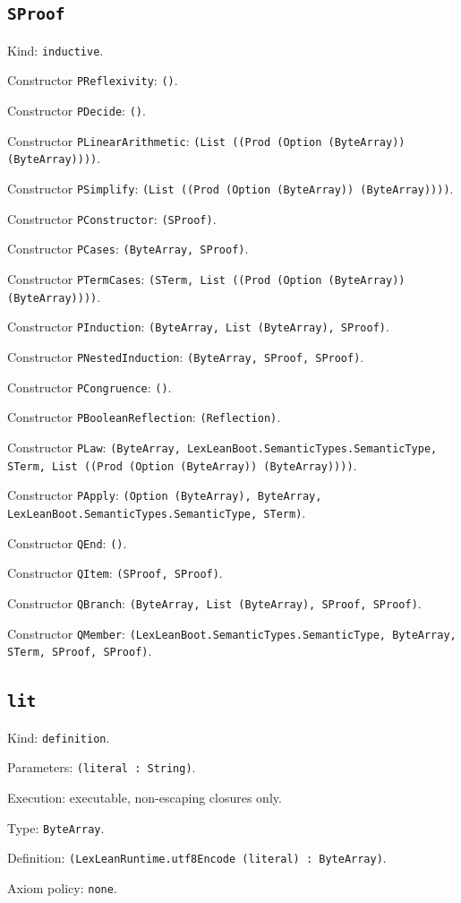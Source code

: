 \documentclass[11pt]{article}
\begin{document}
\subsection*{\texttt{SProof}}
\noindent Kind: \texttt{inductive}.\par
\noindent Constructor \texttt{PReflexivity}: \texttt{()}.\par
\noindent Constructor \texttt{PDecide}: \texttt{()}.\par
\noindent Constructor \texttt{PLinearArithmetic}: \texttt{(List ((Prod (Option (ByteArray)) (ByteArray))))}.\par
\noindent Constructor \texttt{PSimplify}: \texttt{(List ((Prod (Option (ByteArray)) (ByteArray))))}.\par
\noindent Constructor \texttt{PConstructor}: \texttt{(SProof)}.\par
\noindent Constructor \texttt{PCases}: \texttt{(ByteArray, SProof)}.\par
\noindent Constructor \texttt{PTermCases}: \texttt{(STerm, List ((Prod (Option (ByteArray)) (ByteArray))))}.\par
\noindent Constructor \texttt{PInduction}: \texttt{(ByteArray, List (ByteArray), SProof)}.\par
\noindent Constructor \texttt{PNestedInduction}: \texttt{(ByteArray, SProof, SProof)}.\par
\noindent Constructor \texttt{PCongruence}: \texttt{()}.\par
\noindent Constructor \texttt{PBooleanReflection}: \texttt{(Reflection)}.\par
\noindent Constructor \texttt{PLaw}: \texttt{(ByteArray, LexLeanBoot.SemanticTypes.SemanticType, STerm, List ((Prod (Option (ByteArray)) (ByteArray))))}.\par
\noindent Constructor \texttt{PApply}: \texttt{(Option (ByteArray), ByteArray, LexLeanBoot.SemanticTypes.SemanticType, STerm)}.\par
\noindent Constructor \texttt{QEnd}: \texttt{()}.\par
\noindent Constructor \texttt{QItem}: \texttt{(SProof, SProof)}.\par
\noindent Constructor \texttt{QBranch}: \texttt{(ByteArray, List (ByteArray), SProof, SProof)}.\par
\noindent Constructor \texttt{QMember}: \texttt{(LexLeanBoot.SemanticTypes.SemanticType, ByteArray, STerm, SProof, SProof)}.\par
\subsection*{\texttt{lit}}
\noindent Kind: \texttt{definition}.\par
\noindent Parameters: \texttt{(literal : String)}.\par
\noindent Execution: executable, non-escaping closures only.\par
\noindent Type: \texttt{ByteArray}.\par
\noindent Definition: \texttt{(LexLeanRuntime.utf8Encode (literal) : ByteArray)}.\par
\noindent Axiom policy: \texttt{none}.\par
\end{document}

